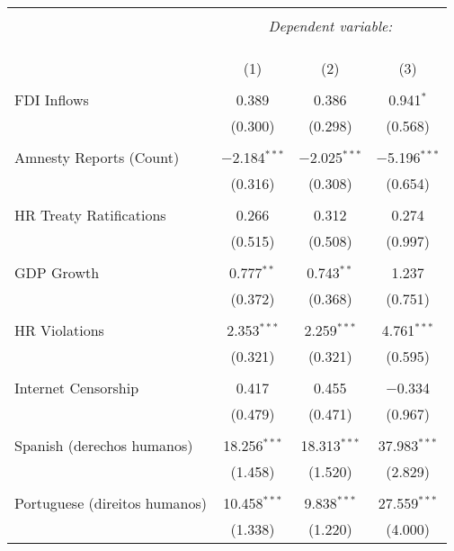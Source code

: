 
\begin{table}[!htbp] \centering 
  \caption{} 
  \label{} 
\begin{tabular}{@{\extracolsep{5pt}}lccc} 
\\[-1.8ex]\hline 
\hline \\[-1.8ex] 
 & \multicolumn{3}{c}{\textit{Dependent variable:}} \\ 
\cline{2-4} 
\\[-1.8ex] & \multicolumn{3}{c}{ } \\ 
\\[-1.8ex] & (1) & (2) & (3)\\ 
\hline \\[-1.8ex] 
 FDI Inflows & 0.389 & 0.386 & 0.941$^{*}$ \\ 
  & (0.300) & (0.298) & (0.568) \\ 
  & & & \\ 
 Amnesty Reports (Count) & $-$2.184$^{***}$ & $-$2.025$^{***}$ & $-$5.196$^{***}$ \\ 
  & (0.316) & (0.308) & (0.654) \\ 
  & & & \\ 
 HR Treaty Ratifications & 0.266 & 0.312 & 0.274 \\ 
  & (0.515) & (0.508) & (0.997) \\ 
  & & & \\ 
 GDP Growth & 0.777$^{**}$ & 0.743$^{**}$ & 1.237 \\ 
  & (0.372) & (0.368) & (0.751) \\ 
  & & & \\ 
 HR Violations & 2.353$^{***}$ & 2.259$^{***}$ & 4.761$^{***}$ \\ 
  & (0.321) & (0.321) & (0.595) \\ 
  & & & \\ 
 Internet Censorship & 0.417 & 0.455 & $-$0.334 \\ 
  & (0.479) & (0.471) & (0.967) \\ 
  & & & \\ 
 Spanish (derechos humanos) & 18.256$^{***}$ & 18.313$^{***}$ & 37.983$^{***}$ \\ 
  & (1.458) & (1.520) & (2.829) \\ 
  & & & \\ 
 Portuguese (direitos humanos) & 10.458$^{***}$ & 9.838$^{***}$ & 27.559$^{***}$ \\ 
  & (1.338) & (1.220) & (4.000) \\ 

\end{tabular}
\end{table}
